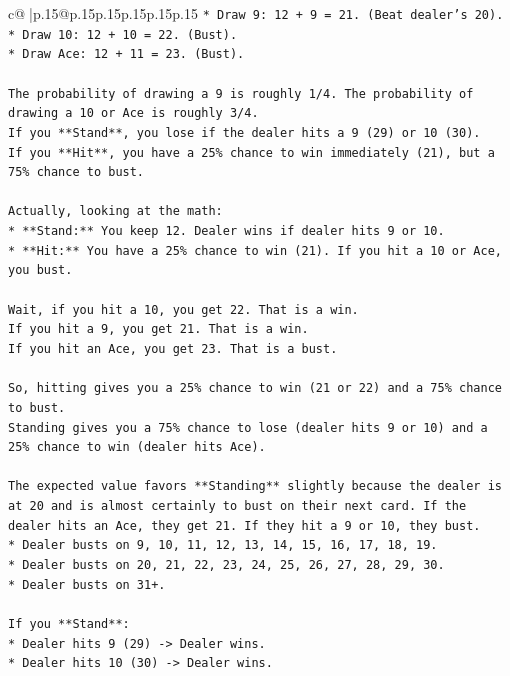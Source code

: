 \documentclass{article}
\begin{document}
{\begin{supertabular}{c@{$\;$}|p{.15\linewidth}@{}p{.15\linewidth}p{.15\linewidth}p{.15\linewidth}p{.15\linewidth}p{.15\linewidth}}
{{{\texttt{*   Draw 9: 12 + 9 = 21. (Beat dealer's 20).} \\
\texttt{*   Draw 10: 12 + 10 = 22. (Bust).} \\
\texttt{*   Draw Ace: 12 + 11 = 23. (Bust).} \\
\\ 
\texttt{The probability of drawing a 9 is roughly 1/4. The probability of drawing a 10 or Ace is roughly 3/4.} \\
\texttt{If you **Stand**, you lose if the dealer hits a 9 (29) or 10 (30).} \\
\texttt{If you **Hit**, you have a 25\% chance to win immediately (21), but a 75\% chance to bust.} \\
\\ 
\texttt{Actually, looking at the math:} \\
\texttt{*   **Stand:** You keep 12. Dealer wins if dealer hits 9 or 10.} \\
\texttt{*   **Hit:** You have a 25\% chance to win (21). If you hit a 10 or Ace, you bust.} \\
\\ 
\texttt{Wait, if you hit a 10, you get 22. That is a win.} \\
\texttt{If you hit a 9, you get 21. That is a win.} \\
\texttt{If you hit an Ace, you get 23. That is a bust.} \\
\\ 
\texttt{So, hitting gives you a 25\% chance to win (21 or 22) and a 75\% chance to bust.} \\
\texttt{Standing gives you a 75\% chance to lose (dealer hits 9 or 10) and a 25\% chance to win (dealer hits Ace).} \\
\\ 
\texttt{The expected value favors **Standing** slightly because the dealer is at 20 and is almost certainly to bust on their next card. If the dealer hits an Ace, they get 21. If they hit a 9 or 10, they bust.} \\
\texttt{*   Dealer busts on 9, 10, 11, 12, 13, 14, 15, 16, 17, 18, 19.} \\
\texttt{*   Dealer busts on 20, 21, 22, 23, 24, 25, 26, 27, 28, 29, 30.} \\
\texttt{*   Dealer busts on 31+.} \\
\\ 
\texttt{If you **Stand**:} \\
\texttt{*   Dealer hits 9 (29) {-}> Dealer wins.} \\
\texttt{*   Dealer hits 10 (30) {-}> Dealer wins.} \\
}}}
\end{supertabular}}
\end{document}
